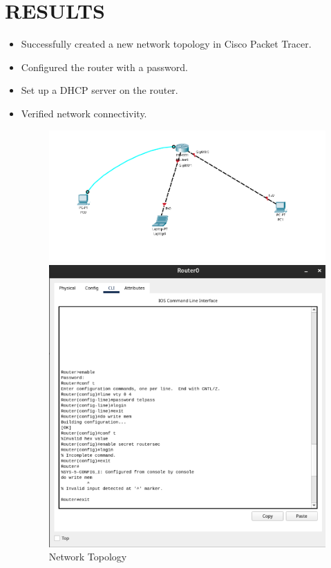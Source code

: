 \documentclass[a4paper,12pt]{article}
\begin{document}
\section*{RESULTS}
\begin{itemize}
    \item Successfully created a new network topology in Cisco Packet Tracer.
    \item Configured the router with a password.
    \item Set up a DHCP server on the router.
    \item Verified network connectivity.

          \begin{figure}[!ht]
              \centering
              \begin{minipage}{0.45\textwidth}
                  \centering
                  \includegraphics[width=\textwidth]{img/topology.png}
                  \caption{Network Topology}
                  \label{fig:network_topology}
              \end{minipage}\hfill
              \begin{minipage}{0.45\textwidth}
                  \centering
                  \includegraphics[width=\textwidth]{img/enable_password.png}

\end{minipage}
\end{figure}
\end{itemize}
\end{document}
